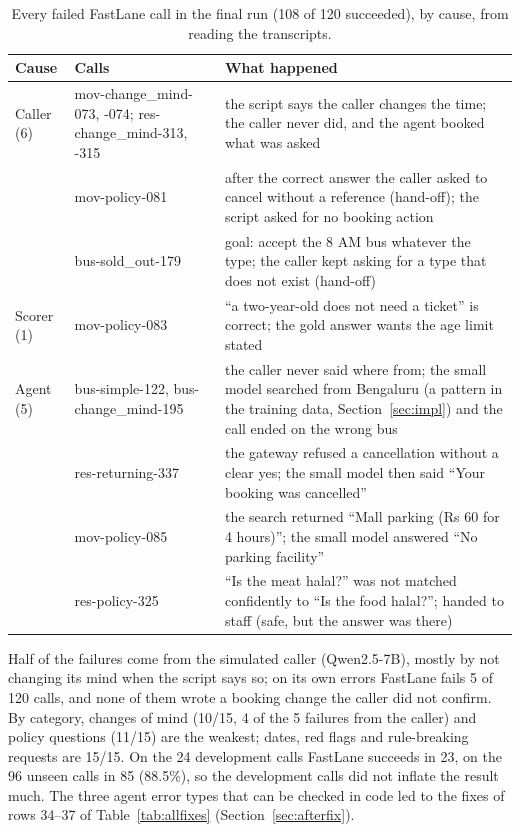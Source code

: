 \documentclass[11pt,a4paper]{article}
\makeatletter
\renewcommand\paragraph{\@startsection{paragraph}{4}{\z@}{1.2ex plus 0.5ex minus 0.2ex}{-1em}{\normalsize\bfseries}}
\makeatother
\begin{document}
\begin{table}[tbp]
\centering\small
\begin{tabularx}{\linewidth}{@{}l>{\raggedright\arraybackslash}p{4.4cm}L@{}}
\toprule
Cause & Calls & What happened \\
\midrule
Caller (6) & mov-change\_mind-073, -074; res-change\_mind-313, -315 & the script says the caller changes the time; the caller never did, and the agent booked what was asked \\
& mov-policy-081 & after the correct answer the caller asked to cancel without a reference (hand-off); the script asked for no booking action \\
& bus-sold\_out-179 & goal: accept the 8 AM bus whatever the type; the caller kept asking for a type that does not exist (hand-off) \\
\midrule
Scorer (1) & mov-policy-083 & ``a two-year-old does not need a ticket'' is correct; the gold answer wants the age limit stated \\
\midrule
Agent (5) & bus-simple-122, bus-change\_mind-195 & the caller never said where from; the small model searched from Bengaluru (a pattern in the training data, Section~\ref{sec:impl}) and the call ended on the wrong bus \\
& res-returning-337 & the gateway refused a cancellation without a clear yes; the small model then said ``Your booking was cancelled'' \\
& mov-policy-085 & the search returned ``Mall parking (Rs 60 for 4 hours)''; the small model answered ``No parking facility'' \\
& res-policy-325 & ``Is the meat halal?'' was not matched confidently to ``Is the food halal?''; handed to staff (safe, but the answer was there) \\
\bottomrule
\end{tabularx}
\caption{Every failed FastLane call in the final run (108 of 120 succeeded), by cause, from reading the transcripts.}
\label{tab:flfail}
\end{table}

\paragraph{FastLane.} Half of the failures come from the simulated caller (Qwen2.5-7B), mostly by not changing its
mind when the script says so; on its own errors FastLane fails 5 of 120 calls, and none of them wrote a booking change
the caller did not confirm. By category, changes of mind (10/15, 4 of the 5 failures from the caller) and policy
questions (11/15) are the weakest; dates, red flags and rule-breaking requests are 15/15. On the 24 development calls
FastLane succeeds in 23, on the 96 unseen calls in 85 (88.5\%), so the development calls did not inflate the result
much. The three agent error types that can be checked in code led to the fixes of rows 34--37 of
Table~\ref{tab:allfixes} (Section~\ref{sec:afterfix}).
\end{document}
